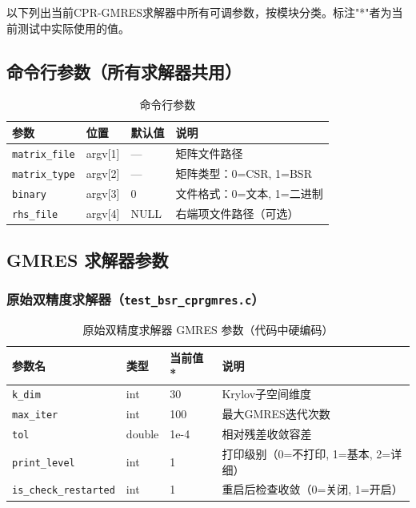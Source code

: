 \documentclass[12pt,a4paper]{article}
\begin{document}
以下列出当前CPR-GMRES求解器中所有可调参数，按模块分类。标注"*"者为当前测试中实际使用的值。

\subsection{命令行参数（所有求解器共用）}

\begin{table}[htbp]
\centering
\caption{命令行参数}
\label{tab:params_cmdline}
\begin{tabular}{llll}
\toprule
参数 & 位置 & 默认值 & 说明 \\
\midrule
\texttt{matrix\_file} & argv[1] & --- & 矩阵文件路径 \\
\texttt{matrix\_type} & argv[2] & --- & 矩阵类型：0=CSR, 1=BSR \\
\texttt{binary} & argv[3] & 0 & 文件格式：0=文本, 1=二进制 \\
\texttt{rhs\_file} & argv[4] & NULL & 右端项文件路径（可选） \\
\bottomrule
\end{tabular}
\end{table}

\subsection{GMRES 求解器参数}

\subsubsection*{原始双精度求解器（\texttt{test\_bsr\_cprgmres.c}）}

\begin{table}[htbp]
\centering
\caption{原始双精度求解器 GMRES 参数（代码中硬编码）}
\label{tab:params_orig_gmres}
\begin{tabular}{llll}
\toprule
参数名 & 类型 & 当前值 * & 说明 \\
\midrule
\texttt{k\_dim} & int & 30 & Krylov子空间维度 \\
\texttt{max\_iter} & int & 100 & 最大GMRES迭代次数 \\
\texttt{tol} & double & 1e-4 & 相对残差收敛容差 \\
\texttt{print\_level} & int & 1 & 打印级别（0=不打印, 1=基本, 2=详细） \\
\texttt{is\_check\_restarted} & int & 1 & 重启后检查收敛（0=关闭, 1=开启） \\
\bottomrule
\end{tabular}
\end{table}
\end{document}
